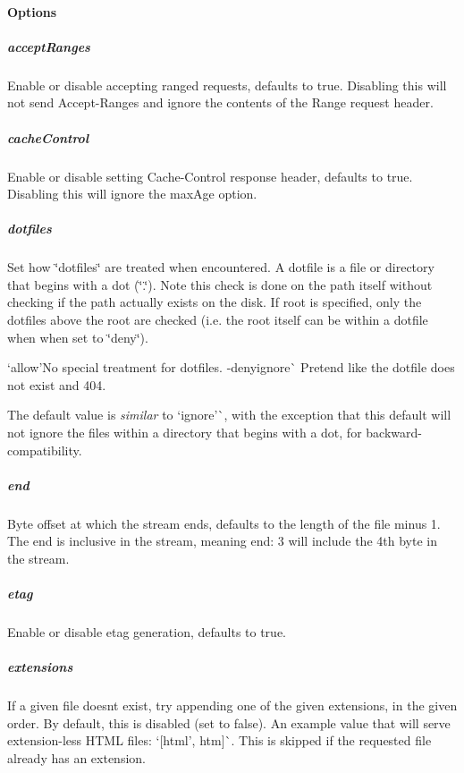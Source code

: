 \paragraph*{Options}

\subparagraph*{accept\+Ranges}

Enable or disable accepting ranged requests, defaults to true. Disabling this will not send {\ttfamily Accept-\/\+Ranges} and ignore the contents of the {\ttfamily Range} request header.

\subparagraph*{cache\+Control}

Enable or disable setting {\ttfamily Cache-\/\+Control} response header, defaults to true. Disabling this will ignore the {\ttfamily max\+Age} option.

\subparagraph*{dotfiles}

Set how \char`\"{}dotfiles\char`\"{} are treated when encountered. A dotfile is a file or directory that begins with a dot (\char`\"{}.\char`\"{}). Note this check is done on the path itself without checking if the path actually exists on the disk. If {\ttfamily root} is specified, only the dotfiles above the root are checked (i.\+e. the root itself can be within a dotfile when when set to \char`\"{}deny\char`\"{}).


\begin{DoxyItemize}
\item `\textquotesingle{}allow'{\ttfamily No special treatment for dotfiles. -\/}\textquotesingle{}deny\textquotesingle{}ignore\textquotesingle{}\`{} Pretend like the dotfile does not exist and 404.
\end{DoxyItemize}

The default value is {\itshape similar} to `\textquotesingle{}ignore'\`{}, with the exception that this default will not ignore the files within a directory that begins with a dot, for backward-\/compatibility.

\subparagraph*{end}

Byte offset at which the stream ends, defaults to the length of the file minus 1. The end is inclusive in the stream, meaning {\ttfamily end\+: 3} will include the 4th byte in the stream.

\subparagraph*{etag}

Enable or disable etag generation, defaults to true.

\subparagraph*{extensions}

If a given file doesn\textquotesingle{}t exist, try appending one of the given extensions, in the given order. By default, this is disabled (set to {\ttfamily false}). An example value that will serve extension-\/less H\+T\+ML files\+: `\mbox{[}\textquotesingle{}html', \textquotesingle{}htm\textquotesingle{}\mbox{]}\`{}. This is skipped if the requested file already has an extension.

